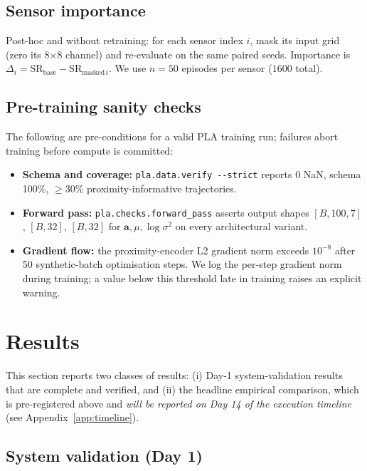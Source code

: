 \documentclass[11pt]{article}
\begin{document}
\subsection{Sensor importance}

Post-hoc and without retraining: for each sensor index $i$, mask its
input grid (zero its 8$\times$8 channel) and re-evaluate on the same
paired seeds. Importance is $\Delta_i = \mathrm{SR}_\mathrm{base} -
\mathrm{SR}_{\mathrm{masked}\,i}$. We use $n = 50$ episodes per sensor
($1600$ total).

\subsection{Pre-training sanity checks}
\label{sec:protocol-checks}

The following are pre-conditions for a valid PLA training run; failures
abort training before compute is committed:
\begin{itemize}[leftmargin=1.5em,topsep=0.2em,itemsep=0.2em]
\item \textbf{Schema and coverage:} \verb|pla.data.verify --strict|
  reports 0 NaN, schema 100\%, $\geq 30\%$ proximity-informative
  trajectories.
\item \textbf{Forward pass:} \verb|pla.checks.forward_pass| asserts
  output shapes $[B, 100, 7]$, $[B, 32]$, $[B, 32]$ for
  $\hat{\mathbf{a}}, \mu, \log\sigma^2$ on every architectural variant.
\item \textbf{Gradient flow:} the proximity-encoder L2 gradient norm
  exceeds $10^{-8}$ after 50 synthetic-batch optimisation steps. We log
  the per-step gradient norm during training; a value below this
  threshold late in training raises an explicit warning.
\end{itemize}

\section{Results}
\label{sec:results}

This section reports two classes of results: (i) Day-1 system-validation
results that are complete and verified, and (ii) the headline empirical
comparison, which is pre-registered above and \emph{will be reported on
Day 14 of the execution timeline} (see
Appendix~\ref{app:timeline}).

\subsection{System validation (Day 1)}
\label{sec:results-validation}
\end{document}
